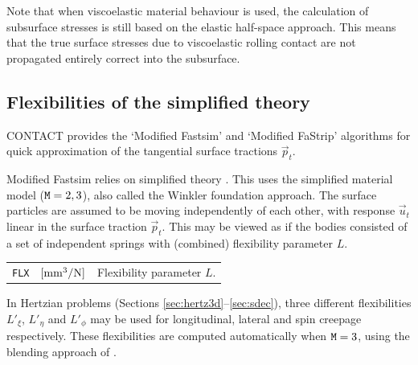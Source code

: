 \documentclass[12pt]{report}
\renewcommand{\magenta}[1]{}
\newenvironment{inputvars}{\vspace{0.4\baselineskip}%

\begin{tabular}{>{\raggedright}p{22mm}p{19mm}p{113mm}}}{
\end{tabular}

}
\newcommand{\inpvar}[3]{{\small\tt #1} & $#2$ & #3 \\[1ex]}
\begin{document}
Note that when viscoelastic material behaviour is used, the calculation of
subsurface stresses is still based on the elastic half-space approach. This
means that the true surface stresses due to viscoelastic rolling contact
are not propagated entirely correct into the subsurface.

\magenta{
\subsection{\texorpdfstring{\magenta{Compressible elastic layer}}{Compressible elastic layer}}
\label{sec:thin_sheet}

A quick fix is made to capture the effect of a sheet of pressure sensitive
paper, using the normal part of Kalker's first order theory \cite[\S
3.2]{Kalker1990}:
\begin{equation}
     u_z^{(3)} = L_z p_n, \;\; 
     L_z = h^{(3)} \frac{(1+\nu^{(3)}) (1-2\nu^{(3)})}{(1-\nu^{(3)}) E^{(3)}} .
\end{equation} 
\begin{inputvars}
\inpvar{FLXZ}{\bunit{mm^3/N}}{Flexibility parameter $L_z$.}
\end{inputvars}
This option is activated with ${\tt B}=1$ (page \pageref{b-digit}).
}

\subsection{Flexibilities of the simplified theory}
\label{sec:fastsim}

CONTACT provides the `Modified Fastsim' \cite{Spiryagin2013} and `Modified
FaStrip' algorithms \cite{Vollebregt2025a-indicators} for quick approximation
of the tangential surface tractions $\vec{p}_t$. 

Modified Fastsim relies on simplified theory \cite{Kalker1973,
Kalker1982a-fastsim}. This uses the simplified material model
(${\tt M}=2,3$), also called the Winkler foundation approach. The surface
particles are assumed to be moving independently of each other, with
response $\vec{u}_t$ linear in the surface traction $\vec{p}_t$. This
may be viewed as if the bodies consisted of a set of independent springs
with (combined) flexibility parameter $L$.
\begin{inputvars}
\inpvar{FLX}{\bunit{mm^3/N}}{Flexibility parameter $L$.}
\end{inputvars}
In Hertzian problems (Sections \ref{sec:hertz3d}--\ref{sec:sdec}),
three different flexibilities $L'_\xi$, $L'_\eta$ and $L'_\phi$ may be
used for longitudinal, lateral and spin creepage respectively. These
flexibilities are computed automatically when ${\tt M}=3$, using the
blending approach of \cite{Vollebregt2022a-1flex}. 
\end{document}
